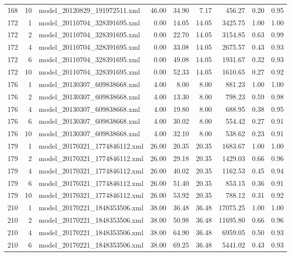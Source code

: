 \begin{table}[ht]
\begin{tabular}{rrlrrrrrr}
  168 &  10 & model\_20120829\_191972511.xml & 46.00 & 34.90 & 7.17 & 456.27 & 0.20 & 0.95 \\ 
  172 &   1 & model\_20110704\_328391695.xml & 0.00 & 14.05 & 14.05 & 3425.75 & 1.00 & 1.00 \\ 
  172 &   2 & model\_20110704\_328391695.xml & 0.00 & 22.70 & 14.05 & 3154.85 & 0.63 & 0.99 \\ 
  172 &   4 & model\_20110704\_328391695.xml & 0.00 & 33.08 & 14.05 & 2675.57 & 0.43 & 0.93 \\ 
  172 &   6 & model\_20110704\_328391695.xml & 0.00 & 49.08 & 14.05 & 1931.67 & 0.32 & 0.93 \\ 
  172 &  10 & model\_20110704\_328391695.xml & 0.00 & 52.33 & 14.05 & 1610.65 & 0.27 & 0.92 \\ 
  176 &   1 & model\_20130307\_609838668.xml & 4.00 & 8.00 & 8.00 & 881.23 & 1.00 & 1.00 \\ 
  176 &   2 & model\_20130307\_609838668.xml & 4.00 & 13.30 & 8.00 & 798.23 & 0.59 & 0.98 \\ 
  176 &   4 & model\_20130307\_609838668.xml & 4.00 & 19.80 & 8.00 & 688.95 & 0.38 & 0.95 \\ 
  176 &   6 & model\_20130307\_609838668.xml & 4.00 & 30.02 & 8.00 & 554.42 & 0.27 & 0.91 \\ 
  176 &  10 & model\_20130307\_609838668.xml & 4.00 & 32.10 & 8.00 & 538.62 & 0.23 & 0.91 \\ 
  179 &   1 & model\_20170321\_1774846112.xml & 26.00 & 20.35 & 20.35 & 1683.67 & 1.00 & 1.00 \\ 
  179 &   2 & model\_20170321\_1774846112.xml & 26.00 & 29.18 & 20.35 & 1429.03 & 0.66 & 0.96 \\ 
  179 &   4 & model\_20170321\_1774846112.xml & 26.00 & 40.02 & 20.35 & 1162.53 & 0.45 & 0.94 \\ 
  179 &   6 & model\_20170321\_1774846112.xml & 26.00 & 51.40 & 20.35 & 853.15 & 0.36 & 0.91 \\ 
  179 &  10 & model\_20170321\_1774846112.xml & 26.00 & 53.92 & 20.35 & 788.12 & 0.31 & 0.92 \\ 
  210 &   1 & model\_20170221\_1848353506.xml & 38.00 & 36.48 & 36.48 & 17075.25 & 1.00 & 1.00 \\ 
  210 &   2 & model\_20170221\_1848353506.xml & 38.00 & 50.98 & 36.48 & 11695.80 & 0.66 & 0.96 \\ 
  210 &   4 & model\_20170221\_1848353506.xml & 38.00 & 64.90 & 36.48 & 6959.05 & 0.50 & 0.93 \\ 
  210 &   6 & model\_20170221\_1848353506.xml & 38.00 & 69.25 & 36.48 & 5441.02 & 0.43 & 0.93 \\ 

\end{tabular}
\end{table}
